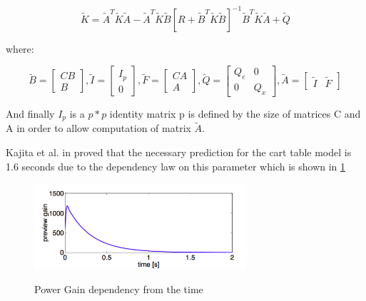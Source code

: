 \documentclass[12pt,a4paper]{report}
\begin{document}
			\begin{equation}\label{eq:pc2}
				\tilde{K} = \tilde{A}^T\tilde{K}\tilde{A} - \tilde{A}^T \tilde{K} \tilde{B} [R + \tilde{B}^T \tilde{K} \tilde{B}]^{-1} \tilde{B}^T\tilde{K}\tilde{A} + \tilde{Q}
			\end{equation}
			
			where:
			
			\begin{equation}\label{eq:pc3}
				\tilde{B} = \begin{bmatrix} C B \\ B \end{bmatrix},
				\tilde{I} = \begin{bmatrix} I_p \\ 0 \end{bmatrix},
				\tilde{F} = \begin{bmatrix} CA \\ A \end{bmatrix},
				\tilde{Q} = \begin{bmatrix} Q_e & 0 \\ 0 & Q_x \end{bmatrix},
				\tilde{A} = \begin{bmatrix} \tilde{I} & \tilde{F} \end{bmatrix}
			\end{equation}
			
			And finally $I_p$ is a $p * p$ identity matrix p is defined by the size of matrices C and A in order to allow computation of matrix $\tilde{A}$.
			
			Kajita et al. in \cite{kajita2003biped} proved that the necessary prediction for the cart table model is 1.6 seconds due to the dependency law on this parameter which is shown in \cref{fig:12} 
			
			\begin{figure}[H]
				\vspace{-0.2cm}
				\centering
				{\includegraphics[width=0.7\textwidth]{12}}
				\caption{Power Gain dependency from the time \cite{kajita2003biped}}
				\label{fig:12}
				\vspace{-0.1cm}
			\end{figure}
			
\end{document}
